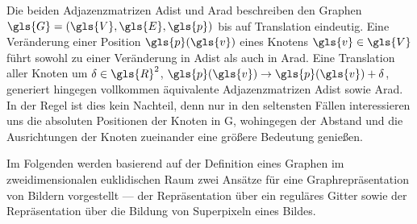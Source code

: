 Die beiden Adjazenzmatrizen \gls{Adist} und \gls{Arad} beschreiben den Graphen $\gls{G} = \left(\gls{V}, \gls{E}, \gls{p}\right)$ bis auf Translation eindeutig.
Eine Veränderung einer Position $\gls{p}\left(\gls{v}\right)$ eines Knotens $\gls{v} \in \gls{V}$ führt sowohl zu einer Veränderung in \gls{Adist} als auch in \gls{Arad}.
Eine Translation aller Knoten um $\ve{\delta} \in \gls{R}^2$, \dhe{} $\gls{p}\left(\gls{v}\right) \rightarrow \gls{p}\left(\gls{v}\right) + \ve{\delta}$, generiert hingegen vollkommen äquivalente Adjazenzmatrizen \gls{Adist} sowie \gls{Arad}.
In der Regel ist dies kein Nachteil, denn nur in den seltensten Fällen interessieren uns die absoluten Positionen der Knoten in \gls{G}, wohingegen der Abstand und die Ausrichtungen der Knoten zueinander eine größere Bedeutung genießen.

Im Folgenden werden basierend auf der Definition eines Graphen im zweidimensionalen  euklidischen Raum zwei Ansätze für eine Graphrepräsentation von Bildern vorgestellt — der Repräsentation über ein reguläres Gitter sowie der Repräsentation über die Bildung von Superpixeln eines Bildes.



